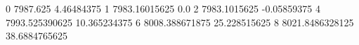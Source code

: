 0 7987.625 4.46484375
1 7983.16015625 0.0
2 7983.1015625 -0.05859375
4 7993.525390625 10.365234375
6 8008.388671875 25.228515625
8 8021.8486328125 38.6884765625
